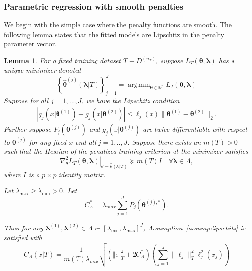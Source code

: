 \documentclass[12pt]{article} %
\newtheorem{lemma}{Lemma}
\theoremstyle{definition}
\DeclareMathOperator*{\argmin}{arg\,min}
\begin{document}
\subsubsection{Parametric regression with smooth penalties}
\label{sec:param_smooth}
We begin with the simple case where the penalty functions are smooth. The following lemma states that the fitted models are Lipschitz in the penalty parameter vector.
\begin{lemma}
	\label{lemma:param_add}
	For a fixed training dataset $T \equiv D^{(n_T)}$, suppose $L_T \left (\boldsymbol{\theta}, \boldsymbol{\lambda} \right)$ has a unique minimizer denoted
	\begin{equation}
	\label{eq:param_add_estimator}
	\left\{
	\hat{\boldsymbol{\theta}}^{(j)}\left (\boldsymbol{\lambda} | T \right )
	\right\}_{j=1}^J =
	\argmin_{\boldsymbol{\theta} \in \mathbb{R}^p} L_T \left (\boldsymbol{\theta}, \boldsymbol{\lambda} \right)
	\end{equation}
	Suppose for all $j = 1,...,J$, we have the Lipschitz condition
	\begin{align}
	\left|
	g_j\left(x|\boldsymbol{\theta}^{(1)}\right)
	-g_j\left(x|\boldsymbol{\theta}^{(2)}\right)
	\right|
	\le
	\ell_j (x)
	\|\boldsymbol{\theta}^{(1)}-\boldsymbol{\theta}^{(2)}\|_{2}.
	\end{align}
	Further suppose $P_j(\boldsymbol{\theta}^{(j)})$ and $g_j(x | \boldsymbol{\theta}^{(j)})$ are twice-differentiable with respect to $\boldsymbol{\theta}^{(j)}$ for any fixed $x$ and all $j=1,..,J$.
	Suppose there exists an $m(T) > 0$ such that the Hessian of the penalized training criterion at the minimizer satisfies
	\begin{equation}
	\left . \nabla_{\theta}^2 L_T \left (\boldsymbol{\theta}, \boldsymbol{\lambda} \right) \right |_{\theta = \hat{\theta}(\boldsymbol{\lambda} | T )} \succeq m(T) I \quad \forall \boldsymbol{\lambda} \in \Lambda,
	\label{eq:smooth_pos_def}
	\end{equation}
	where $I$ is a $p \times p$ identity matrix.
	
	\noindent
	Let $\lambda_{\max} \ge \lambda_{\min} > 0$. Let
	\begin{equation}
	C^*_{\Lambda} = \lambda_{max}\sum_{j=1}^{J} P_{j}(\boldsymbol{\theta}^{(j),*}).
	\end{equation}
	
	\noindent
	Then for any $\boldsymbol{\lambda}^{(1)}, \boldsymbol{\lambda}^{(2)} \in \Lambda \coloneqq \left [ \lambda_{\min}, \lambda_{\max} \right ]^J$,
	Assumption~\ref{assump:lipschitz} is satisfied with
	\begin{equation}
	\label{eq:param_add_lipschitz}
	C_\Lambda(x | T) =
	\frac{1}{m(T) \lambda_{min}}
	\sqrt{
		\left(
		\left\Vert \epsilon \right \Vert_T^2 + 2 C^*_{\Lambda}
		\right)
		\left(
		\sum_{j=1}^J  \|\ell_j\|_T^2 \ell_j^2(x_j)
		\right)
	}
	\end{equation}
\end{lemma}
\end{document}

